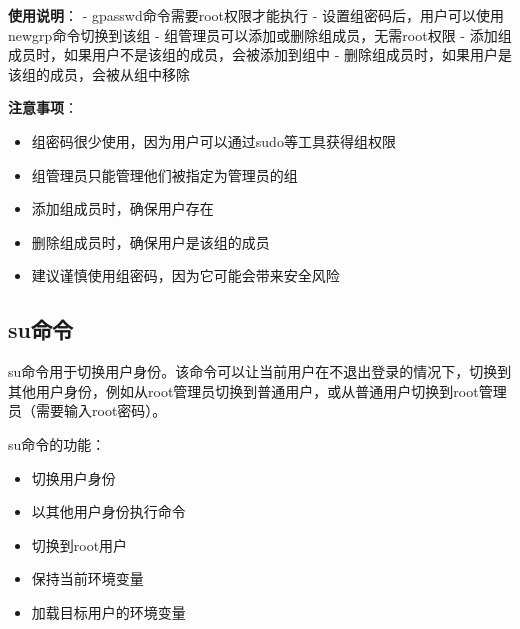 \documentclass[12pt,UTF8]{ctexbook}
\begin{document}
\textbf{使用说明}：
- gpasswd命令需要root权限才能执行
- 设置组密码后，用户可以使用newgrp命令切换到该组
- 组管理员可以添加或删除组成员，无需root权限
- 添加组成员时，如果用户不是该组的成员，会被添加到组中
- 删除组成员时，如果用户是该组的成员，会被从组中移除

\textbf{注意事项}：
\begin{itemize}
    \item 组密码很少使用，因为用户可以通过sudo等工具获得组权限
    \item 组管理员只能管理他们被指定为管理员的组
    \item 添加组成员时，确保用户存在
    \item 删除组成员时，确保用户是该组的成员
    \item 建议谨慎使用组密码，因为它可能会带来安全风险
\end{itemize}

\subsection{su命令}
su命令用于切换用户身份。该命令可以让当前用户在不退出登录的情况下，切换到其他用户身份，例如从root管理员切换到普通用户，或从普通用户切换到root管理员（需要输入root密码）。

su命令的功能：
\begin{itemize}
    \item 切换用户身份
    \item 以其他用户身份执行命令
    \item 切换到root用户
    \item 保持当前环境变量
    \item 加载目标用户的环境变量
\end{itemize}
\end{document}
